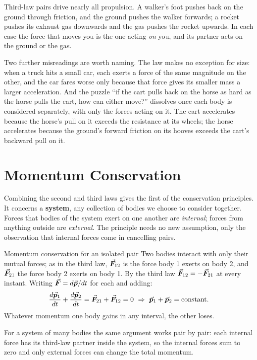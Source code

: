 Third-law pairs drive nearly all propulsion. A walker's foot pushes back on the ground through
friction, and the ground pushes the walker forwards; a rocket pushes its exhaust gas downwards and the
gas pushes the rocket upwards. In each case the force that moves you is the one acting \emph{on} you,
and its partner acts on the ground or the gas.

Two further misreadings are worth naming. The law makes no exception for size: when a truck hits a
small car, each exerts a force of the same magnitude on the other, and the car fares worse only because
that force gives its smaller mass a larger acceleration. And the puzzle ``if the cart pulls back on the
horse as hard as the horse pulls the cart, how can either move?'' dissolves once each body is considered
separately, with only the forces acting on it. The cart accelerates because the horse's pull on it exceeds
the resistance at its wheels; the horse accelerates because the ground's forward friction on its hooves
exceeds the cart's backward pull on it.

\section{Momentum Conservation}

Combining the second and third laws gives the first of the conservation principles. It concerns a
\textbf{system}, any collection of bodies we choose to consider together. Forces that bodies of the
system exert on one another are \emph{internal}; forces from anything outside are \emph{external}. The
principle needs no new assumption, only the observation that internal forces come in cancelling pairs.

\begin{derivbox}{Momentum conservation for an isolated pair}
Two bodies interact with only their mutual forces; as in the third law, $\vec{\bm{F}}_{12}$ is the force body 1
exerts on body 2, and $\vec{\bm{F}}_{21}$ the force body 2 exerts on body 1. By the third law
$\vec{\bm{F}}_{12}=-\vec{\bm{F}}_{21}$ at every instant. Writing $\vec{\bm{F}}=d\vec{\bm{p}}/dt$ for each and adding:
\[
\frac{d\vp_1}{dt}+\frac{d\vp_2}{dt}=\vF_{21}+\vF_{12}=0\ \Rightarrow\ \vp_1+\vp_2=\text{constant}.
\]
Whatever momentum one body gains in any interval, the other loses.
\end{derivbox}

For a system of many bodies the same argument works pair by pair: each internal force has its
third-law partner inside the system, so the internal forces sum to zero and only external forces can
change the total momentum.

